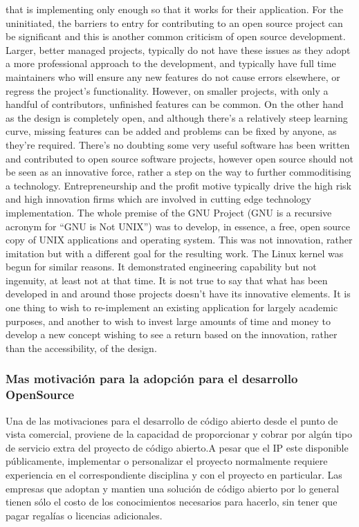 that is implementing only enough so that it works for their application. For the
uninitiated, the barriers to entry for contributing to an open source project can
be significant and this is another common criticism of open source development.
Larger, better managed projects, typically do not have these issues as they adopt a
more professional approach to the development, and typically have full time maintainers
who will ensure any new features do not cause errors elsewhere, or regress
the project’s functionality. However, on smaller projects, with only a handful of
contributors, unfinished features can be common. On the other hand as the design
is completely open, and although there’s a relatively steep learning curve, missing
features can be added and problems can be fixed by anyone, as they’re required.
There’s no doubting some very useful software has been written and contributed
to open source software projects, however open source should not be seen as an innovative
force, rather a step on the way to further commoditising a technology.
Entrepreneurship and the profit motive typically drive the high risk and high innovation
firms which are involved in cutting edge technology implementation. The
whole premise of the GNU Project (GNU is a recursive acronym for “GNU is Not
UNIX”) was to develop, in essence, a free, open source copy of UNIX applications
and operating system. This was not innovation, rather imitation but with a different
goal for the resulting work. The Linux kernel was begun for similar reasons.
It demonstrated engineering capability but not ingenuity, at least not at that time.
It is not true to say that what has been developed in and around those projects
doesn’t have its innovative elements. It is one thing to wish to re-implement an
existing application for largely academic purposes, and another to wish to invest
large amounts of time and money to develop a new concept wishing to see a return
based on the innovation, rather than the accessibility, of the design.

		\subsubsection{Mas motivación para la adopción para el desarrollo OpenSource}

Una de las motivaciones para el desarrollo de código abierto desde el punto de vista comercial,  proviene de la capacidad de proporcionar y cobrar por algún tipo de servicio extra del proyecto de código abierto.A pesar que el IP este disponible públicamente, implementar o personalizar el proyecto normalmente requiere experiencia en el correspondiente disciplina y con el proyecto en particular. Las empresas que adoptan y mantien una solución de código abierto por lo general tienen sólo el costo de los conocimientos necesarios para hacerlo, sin tener que pagar regalías o licencias adicionales.  

